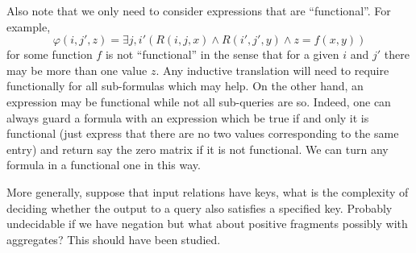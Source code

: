 Also note that we only need to consider expressions that are ``functional''. For example,
$$
\varphi(i,j',z)=\exists j,i' ( R(i,j,x)\land R(i',j',y)\land z=f(x,y))
$$
for some function $f$ is not ``functional'' in the sense that for a given $i$ and $j'$ there may be more than one value $z$. Any inductive translation will need to require functionally for all sub-formulas
which  may help. On the other hand, an expression may be functional while not all sub-queries are so. Indeed, one can always guard a formula with an expression which be true if and only it is functional
(just express that there are no two values corresponding to the same entry) and return say the zero matrix if it is not functional. We can turn any formula in a functional one in this way.

More generally, suppose that input relations have keys, what is the complexity of deciding whether the output to a query also satisfies a specified key. Probably undecidable if we have negation but what about
positive fragments possibly with aggregates? This should have been studied.









